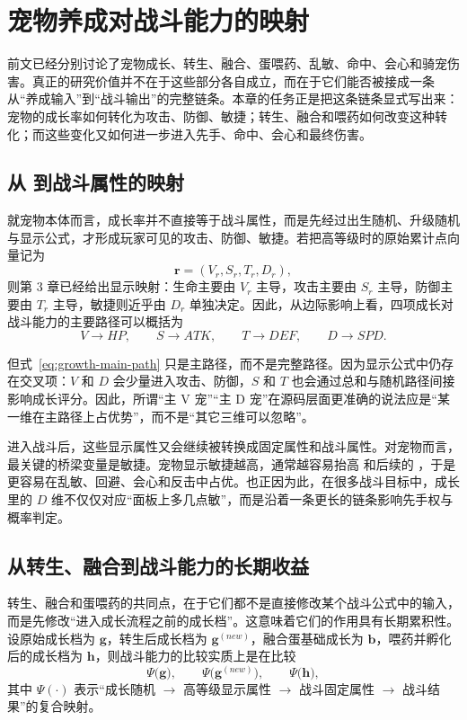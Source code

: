 \chapter{宠物养成对战斗能力的映射}

前文已经分别讨论了宠物成长、转生、融合、蛋喂药、乱敏、命中、会心和骑宠伤害。真正的研究价值并不在于这些部分各自成立，而在于它们能否被接成一条从“养成输入”到“战斗输出”的完整链条。本章的任务正是把这条链条显式写出来：宠物的成长率如何转化为攻击、防御、敏捷；转生、融合和喂药如何改变这种转化；而这些变化又如何进一步进入先手、命中、会心和最终伤害。

\section{从 \vstd{} 到战斗属性的映射}

就宠物本体而言，成长率并不直接等于战斗属性，而是先经过出生随机、升级随机与显示公式，才形成玩家可见的攻击、防御、敏捷。若把高等级时的原始累计点向量记为
\begin{equation}
    \bm{r}=(V_r,S_r,T_r,D_r),
\end{equation}
则第 3 章已经给出显示映射：生命主要由 $V_r$ 主导，攻击主要由 $S_r$ 主导，防御主要由 $T_r$ 主导，敏捷则近乎由 $D_r$ 单独决定。因此，从边际影响上看，四项成长对战斗能力的主要路径可以概括为
\begin{equation}
    V \rightarrow HP,\qquad S \rightarrow ATK,\qquad T \rightarrow DEF,\qquad D \rightarrow SPD.
    \label{eq:growth-main-path}
\end{equation}

但式~\eqref{eq:growth-main-path} 只是主路径，而不是完整路径。因为显示公式中仍存在交叉项：$V$ 和 $D$ 会少量进入攻击、防御，$S$ 和 $T$ 也会通过总和与随机路径间接影响成长评分。因此，所谓“主 V 宠”“主 D 宠”在源码层面更准确的说法应是“某一维在主路径上占优势”，而不是“其它三维可以忽略”。

进入战斗后，这些显示属性又会继续被转换成固定属性和战斗属性。对宠物而言，最关键的桥梁变量是敏捷。宠物显示敏捷越高，通常越容易抬高  和后续的 ，于是更容易在乱敏、回避、会心和反击中占优。也正因为此，在很多战斗目标中，成长里的 $D$ 维不仅仅对应“面板上多几点敏”，而是沿着一条更长的链条影响先手权与概率判定。

\section{从转生、融合到战斗能力的长期收益}

转生、融合和蛋喂药的共同点，在于它们都不是直接修改某个战斗公式中的输入，而是先修改“进入成长流程之前的成长档”。这意味着它们的作用具有长期累积性。设原始成长档为 $\bm{g}$，转生后成长档为 $\bm{g}^{(new)}$，融合蛋基础成长为 $\bm{b}$，喂药并孵化后的成长档为 $\bm{h}$，则战斗能力的比较实质上是在比较
\begin{equation}
    \Psi\bigl(\bm{g}\bigr),\qquad \Psi\bigl(\bm{g}^{(new)}\bigr),\qquad \Psi\bigl(\bm{h}\bigr),
\end{equation}
其中 $\Psi(\cdot)$ 表示“成长随机 $\rightarrow$ 高等级显示属性 $\rightarrow$ 战斗固定属性 $\rightarrow$ 战斗结果”的复合映射。


